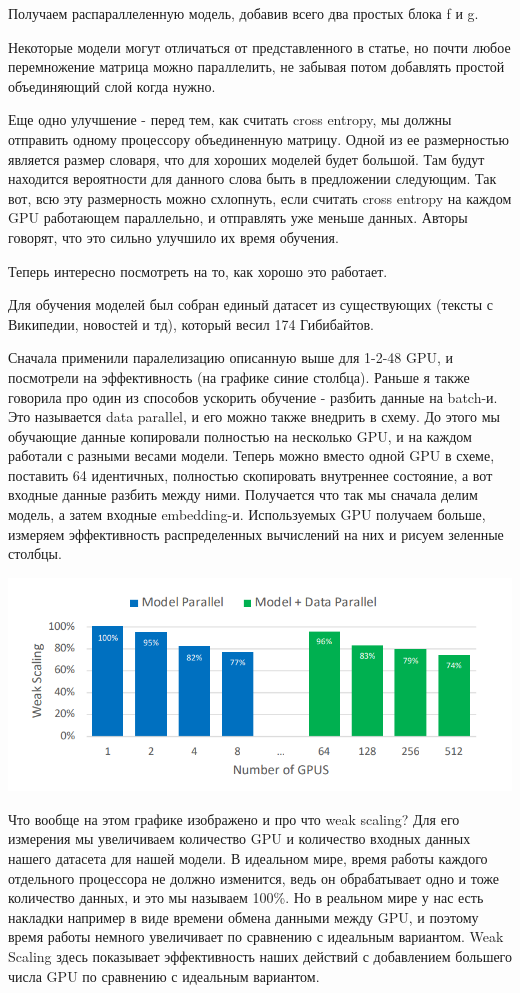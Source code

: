 Получаем распараллеленную модель, добавив всего два простых блока f и g.


Некоторые модели могут отличаться от представленного в статье, но почти любое перемножение матрица можно параллелить, не забывая потом добавлять простой объединяющий слой когда нужно. 

Еще одно  улучшение - перед тем, как считать cross entropy, мы должны отправить одному процессору объединенную матрицу. Одной из ее размерностью является размер словаря, что для хороших моделей будет большой. Там будут находится вероятности для данного слова быть в предложении следующим. Так вот, всю эту размерность можно схлопнуть, если считать  cross entropy на каждом GPU работающем параллельно, и отправлять уже меньше данных. Авторы говорят, что это сильно улучшило их время обучения. 

Теперь интересно посмотреть на то, как хорошо это работает.

Для обучения моделей был собран единый датасет из существующих (тексты с Википедии, новостей и тд), который весил 174 Гибибайтов. 

Сначала применили паралелизацию описанную выше для 1-2-48 GPU, и посмотрели на эффективность (на графике синие столбца). Раньше я также говорила про один из способов ускорить обучение - разбить данные на batch-и. Это называется data parallel, и его можно также внедрить в схему. До этого мы обучающие данные копировали полностью на несколько GPU, и на каждом работали с разными весами модели. Теперь можно вместо одной GPU в схеме, поставить 64 идентичных, полностью скопировать внутреннее состояние, а вот входные данные разбить между ними. Получается что так мы сначала делим модель, а затем входные embedding-и. Используемых GPU получаем больше, измеряем эффективность распределенных вычислений на них и рисуем зеленные столбцы.

\includegraphics[width=0.8\linewidth]{Parts/images/TP_weak_scaling.png}

Что вообще на этом графике изображено и про что weak scaling? Для его измерения мы увеличиваем количество GPU и количество входных данных нашего датасета для нашей модели. В идеальном мире, время работы каждого отдельного процессора не должно изменится, ведь он обрабатывает одно и тоже количество данных, и это мы называем 100\%. Но в реальном мире у нас есть накладки например в виде времени обмена данными между GPU, и поэтому время работы немного увеличивает по сравнению с идеальным вариантом. Weak Scaling здесь показывает эффективность наших действий с добавлением большего числа GPU по сравнению с идеальным вариантом.

